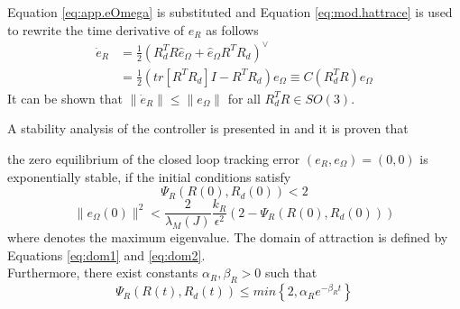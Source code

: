 Equation \ref{eq:app.eOmega} is substituted and Equation \ref{eq:mod.hattrace} is used to rewrite the time derivative of $ e_R $ as follows
 \begin{equation}\label{key}
 \begin{aligned}
 \dot{e}_R&=\frac{1}{2}(R_d^TR\hat{e}_\Omega+\hat{e}_\Omega R^TR_d)^\vee\\
 &=\frac{1}{2}(tr[R^TR_d]I-R^TR_d)e_\Omega \equiv C(R_d^TR)e_\Omega
 \end{aligned}
 \end{equation}
It can be shown that $ \parallel\dot{e}_R\parallel\leq\parallel e_\Omega \parallel  $ for all $ R^T_dR\in SO(3) $.
 
A stability analysis of the controller is presented in \cite{Lee2010} and it is proven that 

the zero equilibrium of the closed loop tracking error $ (e_R,e_\Omega)=(0,0) $ is exponentially stable, if the initial conditions satisfy
\begin{equation}\label{eq:dom1}
\Psi_R(R(0),R_d(0))<2
\end{equation}
\begin{equation}\label{eq:dom2}
\parallel e_\Omega(0)\parallel^2<\frac{2}{\lambda_M(J)}\frac{k_R}{\epsilon^2}(2-\Psi_R(R(0),R_d(0)))
\end{equation}
where  denotes the maximum eigenvalue. The domain of attraction is defined by Equations \ref{eq:dom1} and \ref{eq:dom2}. \\
Furthermore, there exist constants $ \alpha_R,\beta_R>0 $ such that
\begin{equation}\label{eq:con.PsiRconv}
\Psi_R(R(t),R_d(t)) \leq min\left\lbrace 2,\alpha_Re^{-\beta_Rt}\right\rbrace 
\end{equation}


